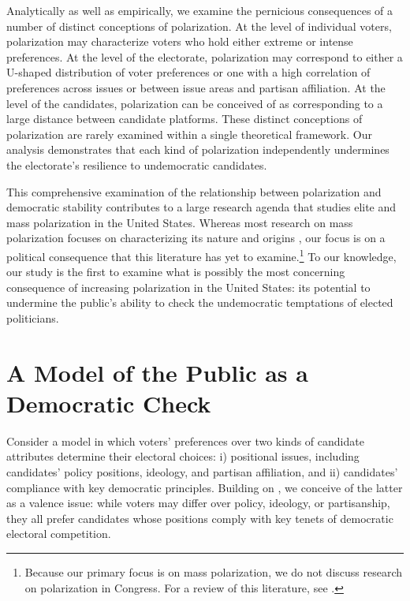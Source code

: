 \documentclass[letterpaper, 12pt]{article}
\begin{document}
\begin{raggedright}
Analytically as well as empirically, we examine the pernicious consequences of a number of distinct conceptions of polarization. At the level of individual voters, polarization may characterize voters who hold either extreme or intense preferences. At the level of the electorate, polarization may correspond to either a U-shaped distribution of voter preferences or one with a high correlation of preferences across issues or between issue areas and partisan affiliation. At the level of the candidates, polarization can be conceived of as corresponding to a large distance between candidate platforms. These distinct conceptions of polarization are rarely examined within a single theoretical framework. Our analysis demonstrates that each kind of polarization independently undermines the electorate's resilience to undemocratic candidates.

This comprehensive examination of the relationship between polarization and democratic stability contributes to a large research agenda that studies elite and mass polarization in the United States. Whereas most research on mass polarization focuses on characterizing its nature and origins \citep{Abramowitz2008,Fiorina2008,McCarty2008,Iyengar2018}, our focus is on a political consequence that this literature has yet to examine.\footnote{Because our primary focus is on mass polarization, we do not discuss research on polarization in Congress. For a review of this literature, see \citet{BarberMcCarty2015}.} To our knowledge, our study is the first to examine what is possibly the most concerning consequence of increasing polarization in the United States: its potential to undermine the public's ability to check the undemocratic temptations of elected politicians.

\section{A Model of the Public as a Democratic Check}
\label{sec: model}

Consider a model in which voters' preferences over two kinds of candidate attributes determine their electoral choices: i) positional issues, including candidates' policy positions, ideology, and partisan affiliation, and ii) candidates' compliance with key democratic principles. Building on \citet{Svolik2019}, we conceive of the latter as a valence issue: while voters may differ over policy, ideology, or partisanship, they all prefer candidates whose positions comply with key tenets of democratic electoral competition.


\end{raggedright}
\end{document}
